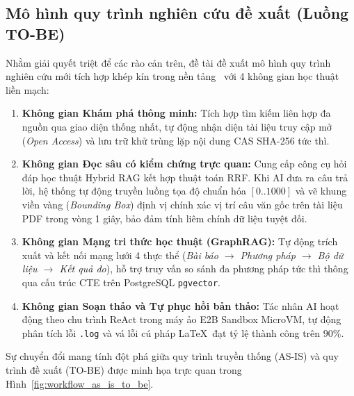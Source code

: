 \subsection{Mô hình quy trình nghiên cứu đề xuất (Luồng TO-BE)}
\label{subsec:luong_to_be}
Nhằm giải quyết triệt để các rào cản trên, đề tài đề xuất mô hình quy trình nghiên cứu mới tích hợp khép kín trong nền tảng \VS\ với 4 không gian học thuật liền mạch:
\begin{enumerate}[label=\textbf{(\arabic*)}]
    \item \textbf{Không gian Khám phá thông minh:} Tích hợp tìm kiếm liên hợp đa nguồn qua giao diện thống nhất, tự động nhận diện tài liệu truy cập mở (\textit{Open Access}) và lưu trữ khử trùng lặp nội dung CAS SHA-256 tức thì.
    \item \textbf{Không gian Đọc sâu có kiểm chứng trực quan:} Cung cấp công cụ hỏi đáp học thuật Hybrid RAG kết hợp thuật toán RRF. Khi AI đưa ra câu trả lời, hệ thống tự động truyền luồng tọa độ chuẩn hóa $[0..1000]$ và vẽ khung viền vàng (\textit{Bounding Box}) định vị chính xác vị trí câu văn gốc trên tài liệu PDF trong vòng 1 giây, bảo đảm tính liêm chính dữ liệu tuyệt đối.
    \item \textbf{Không gian Mạng tri thức học thuật (GraphRAG):} Tự động trích xuất và kết nối mạng lưới 4 thực thể (\textit{Bài báo $\rightarrow$ Phương pháp $\rightarrow$ Bộ dữ liệu $\rightarrow$ Kết quả đo}), hỗ trợ truy vấn so sánh đa phương pháp tức thì thông qua cấu trúc CTE trên PostgreSQL \texttt{pgvector}.
    \item \textbf{Không gian Soạn thảo và Tự phục hồi bản thảo:} Tác nhân AI hoạt động theo chu trình ReAct trong máy ảo E2B Sandbox MicroVM, tự động phân tích lỗi \texttt{.log} và vá lỗi cú pháp \LaTeX\ đạt tỷ lệ thành công trên $90\%$.
\end{enumerate}

Sự chuyển đổi mang tính đột phá giữa quy trình truyền thống (AS-IS) và quy trình đề xuất (TO-BE) được minh họa trực quan trong Hình~\ref{fig:workflow_as_is_to_be}.

